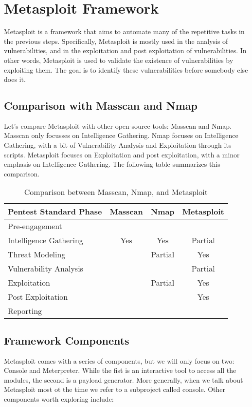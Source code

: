 \section{Metasploit Framework}

Metasploit is a framework that aims to automate many of the repetitive tasks in the previous steps. Specifically, Metasploit is mostly used in the analysis of vulnerabilities, and in the exploitation and post exploitation of vulnerabilities. In other words, Metasploit is used to validate the existence of vulnerabilities by exploiting them. The goal is to identify these vulnerabilities before somebody else does it.

\subsection{Comparison with Masscan and Nmap}

Let's compare Metasploit with other open-source tools: Masscan and Nmap. Masscan only focusses on Intelligence Gathering. Nmap focuses on Intelligence Gathering, with a bit of Vulnerability Analysis and Exploitation through its scripts. Metasploit focuses on Exploitation and post exploitation, with a minor emphasis on Intelligence Gathering. The following table summarizes this comparison.

\begin{table}[h!]
    \centering
    \begin{tabular}{|l|c|c|c|} 
        \hline
        Pentest Standard Phase & Masscan & Nmap & Metasploit \\ [0.5ex] 
        \hline\hline
        Pre-engagement & & & \\
        Intelligence Gathering & Yes & Yes & Partial \\
        Threat Modeling & & Partial & Yes \\
        Vulnerability Analysis &  &  & Partial \\
        Exploitation & & Partial & Yes \\
        Post Exploitation & & & Yes \\
        Reporting & & & \\
        \hline
    \end{tabular}
    \caption{Comparison between Masscan, Nmap, and Metasploit}
\end{table}

\subsection{Framework Components}
Metasploit comes with a series of components, but we will only focus on two: Console and Meterpreter. While the fist is an interactive tool to access all the modules, the second is a payload generator. More generally, when we talk about Metasploit most ot the time we refer to a subproject called console. Other components worth exploring include:

